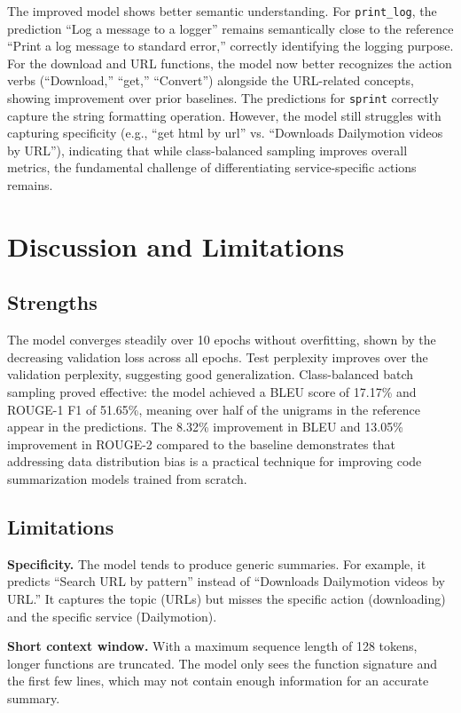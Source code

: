\documentclass[11pt]{article}
\begin{document}
The improved model shows better semantic understanding. For \texttt{print\_log}, the prediction ``Log a message to a logger'' remains semantically close to the reference ``Print a log message to standard error,'' correctly identifying the logging purpose. For the download and URL functions, the model now better recognizes the action verbs (``Download,'' ``get,'' ``Convert'') alongside the URL-related concepts, showing improvement over prior baselines. The predictions for \texttt{sprint} correctly capture the string formatting operation. However, the model still struggles with capturing specificity (e.g., ``get html by url'' vs. ``Downloads Dailymotion videos by URL''), indicating that while class-balanced sampling improves overall metrics, the fundamental challenge of differentiating service-specific actions remains.

\section{Discussion and Limitations}

\subsection{Strengths}

The model converges steadily over 10 epochs without overfitting, shown by the decreasing validation loss across all epochs. Test perplexity improves over the validation perplexity, suggesting good generalization. Class-balanced batch sampling proved effective: the model achieved a BLEU score of 17.17\% and ROUGE-1 F1 of 51.65\%, meaning over half of the unigrams in the reference appear in the predictions. The 8.32\% improvement in BLEU and 13.05\% improvement in ROUGE-2 compared to the baseline demonstrates that addressing data distribution bias is a practical technique for improving code summarization models trained from scratch.

\subsection{Limitations}

\textbf{Specificity.} The model tends to produce generic summaries. For example, it predicts ``Search URL by pattern'' instead of ``Downloads Dailymotion videos by URL.'' It captures the topic (URLs) but misses the specific action (downloading) and the specific service (Dailymotion).

\textbf{Short context window.} With a maximum sequence length of 128 tokens, longer functions are truncated. The model only sees the function signature and the first few lines, which may not contain enough information for an accurate summary.
\end{document}
